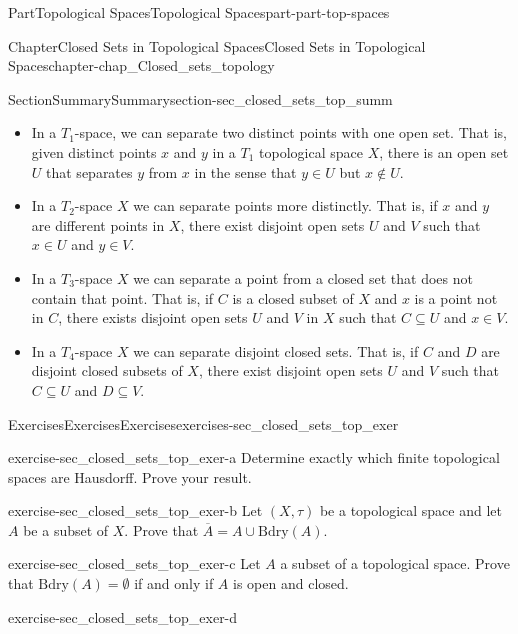 \documentclass[oneside,10pt,]{book}
\numberwithin{equation}{chapter}
\newcommand{\Bdry}{\text{Bdry}}
\begin{document}
\begin{partptx}{Part}{Topological Spaces}{}{Topological Spaces}{}{}{part-part-top-spaces}
\begin{chapterptx}{Chapter}{Closed Sets in Topological Spaces}{}{Closed Sets in Topological Spaces}{}{}{chapter-chap_Closed_sets_topology}
\begin{sectionptx}{Section}{Summary}{}{Summary}{}{}{section-sec_closed_sets_top_summ}
\begin{itemize}[label=\textbullet]
\begin{itemize}[label=$\circ$]
\item{}In a \(T_1\)-space, we can separate two distinct points with one open set. That is, given distinct points \(x\) and \(y\) in a \(T_1\) topological space \(X\), there is an open set \(U\) that separates \(y\) from \(x\) in the sense that \(y \in U\) but \(x \notin U\).%
\item{}In a \(T_2\)-space \(X\) we can separate points more distinctly. That is, if \(x\) and \(y\) are different points in \(X\), there exist disjoint open sets \(U\) and \(V\) such that \(x \in U\) and \(y \in V\).%
\item{}In a \(T_3\)-space \(X\) we can separate a point from a closed set that does not contain that point. That is, if \(C\) is a closed subset of \(X\) and \(x\) is a point not in \(C\), there exists disjoint open sets \(U\) and \(V\) in \(X\) such that \(C \subseteq U\) and \(x \in V\).%
\item{}In a \(T_4\)-space \(X\) we can separate disjoint closed sets. That is, if \(C\) and \(D\) are disjoint closed subsets of \(X\), there exist disjoint open sets \(U\) and \(V\) such that \(C \subseteq U\) and \(D \subseteq V\).%
\end{itemize}
%
\end{itemize}
%
\end{sectionptx}
%
%
\typeout{************************************************}
\typeout{************************************************}
%
\begin{exercises-section}{Exercises}{Exercises}{}{Exercises}{}{}{exercises-sec_closed_sets_top_exer}
\begin{divisionexercise}{1}{}{}{exercise-sec_closed_sets_top_exer-a}%
Determine exactly which finite topological spaces are Hausdorff. Prove your result.%
\end{divisionexercise}%
\begin{divisionexercise}{2}{}{}{exercise-sec_closed_sets_top_exer-b}%
Let \((X, \tau)\) be a topological space and let \(A\) be a subset of \(X\). Prove that \(\overline{A} = A \cup \Bdry(A)\).%
\end{divisionexercise}%
\begin{divisionexercise}{3}{}{}{exercise-sec_closed_sets_top_exer-c}%
Let \(A\) a subset of a topological space. Prove that \(\Bdry(A) = \emptyset\) if and only if \(A\) is open and closed.%
\end{divisionexercise}%
\begin{divisionexercise}{4}{}{}{exercise-sec_closed_sets_top_exer-d}%

\end{divisionexercise}
\end{exercises-section}
\end{chapterptx}
\end{partptx}
\end{document}
